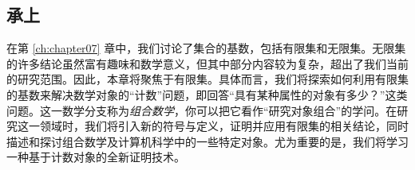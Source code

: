 
\subsection{承上}

在第 \ref{ch:chapter07} 章中，我们讨论了集合的基数，包括有限集和无限集。无限集的许多结论虽然富有趣味和数学意义，但其中部分内容较为复杂，超出了我们当前的研究范围。因此，本章将聚焦于有限集。具体而言，我们将探索如何利用有限集的基数来解决数学对象的``计数''问题，即回答``具有某种属性的对象有多少？''这类问题。这一数学分支称为\emph{组合数学}，你可以把它看作``研究对象组合''的学问。在研究这一领域时，我们将引入新的符号与定义，证明并应用有限集的相关结论，同时描述和探讨组合数学及计算机科学中的一些特定对象。尤为重要的是，我们将学习一种基于计数对象的全新证明技术。
